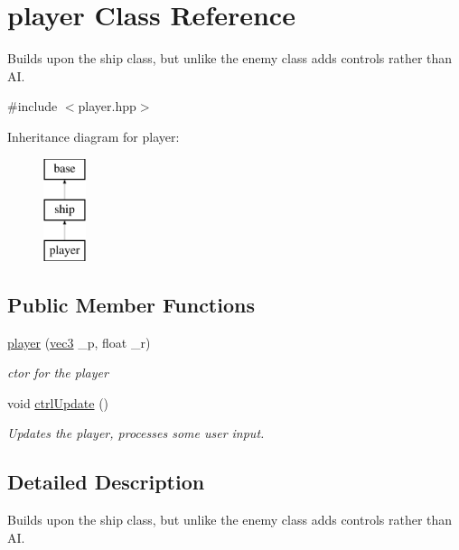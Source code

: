 \hypertarget{classplayer}{\section{player Class Reference}
\label{classplayer}
}


Builds upon the ship class, but unlike the enemy class adds controls rather than A\-I.  




{\ttfamily \#include $<$player.\-hpp$>$}

Inheritance diagram for player\-:\begin{figure}[H]
\begin{center}
\leavevmode
\includegraphics[height=3.000000cm]{classplayer}
\end{center}
\end{figure}
\subsection*{Public Member Functions}
\begin{DoxyCompactItemize}
\item 
\hyperlink{classplayer_a9b375359a880c6fe0294ffd11d498761}{player} (\hyperlink{structvec3}{vec3} \-\_\-p, float \-\_\-r)
\begin{DoxyCompactList}\small\item\em ctor for the player \end{DoxyCompactList}\item 
\hypertarget{classplayer_a232e4cb06a429758f6acec8d16c71b08}{void \hyperlink{classplayer_a232e4cb06a429758f6acec8d16c71b08}{ctrl\-Update} ()}\label{classplayer_a232e4cb06a429758f6acec8d16c71b08}

\begin{DoxyCompactList}\small\item\em Updates the player, processes some user input. \end{DoxyCompactList}\end{DoxyCompactItemize}


\subsection{Detailed Description}
Builds upon the ship class, but unlike the enemy class adds controls rather than A\-I. 

